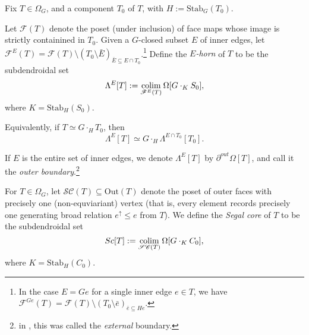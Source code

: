 \documentclass[a4paper,10pt,draft]{article}%
\numberwithin{equation}{section}%
\begin{document}
\begin{definition}
      Fix $T\in \Omega_G$, and a component $T_0$ of $T$, with $H := \mathrm{Stab}_G(T_0)$.
      
      Let $\mathscr{F}(T)$ denote the poset (under inclusion) of face maps whose image is
      strictly containined in $T_0$.
      Given a $G$-closed subset $E$ of inner edges, let
      $\mathscr{F}^{E}(T) = \mathscr{F}(T) \setminus (T_0 \setminus \bar E)_{\bar E \subseteq E \cap T_0}$.\footnote{
        In the case $E = G e$ for a single inner edge $e \in T$, we have
      $\mathscr{F}^{G e}(T) = \mathscr{F}(T) \setminus (T_0 \setminus \bar e)_{\bar e \subseteq H e}$.}
      Define the \textit{$E$-horn} of $T$ to be the subdendroidal set
      \begin{equation}
            \Lambda^{E}[T] := \mathop{\operatorname{colim}}\limits_{\mathscr{F}^{E}(T)}\Omega[G \cdot_K S_0],
      \end{equation}
      where $K = \mathrm{Stab}_H(S_0)$.
\end{definition}

\begin{remark}
      Equivalently, if $T \simeq G \cdot_H T_0$, then
      \begin{equation}
            \Lambda^{E}[T] \simeq G \cdot_H \Lambda^{E \cap T_0}[T_0].
      \end{equation}
\end{remark}

\begin{remark}
      If $E$ is the entire set of inner edges, we denote $\Lambda^{E}[T]$ by $\partial^{out}\Omega[T]$,
      and call it the \textit{outer boundary}.\footnote{
        in \cite{CM13a}, this was called the \textit{external} boundary.}
\end{remark}

\begin{definition}
      For $T \in \Omega_G$, let $\mathscr{SC}(T) \subseteq \mathrm{Out}(T)$ denote the poset of outer faces
      with precisely one (non-equviariant) vertex
      (that is, every element records precisely one generating broad relation
      $e^\uparrow \leq e$ from $T$).
      We define the \textit{Segal core} of $T$ to be the subdendroidal set
      \begin{equation}
            Sc[T] := \mathop{\operatorname{colim}}\limits_{\mathscr{SC}(T)}\Omega[G \cdot_K C_0],
      \end{equation}
      where $K = \mathrm{Stab}_H(C_0)$. 
\end{definition}
\end{document}
